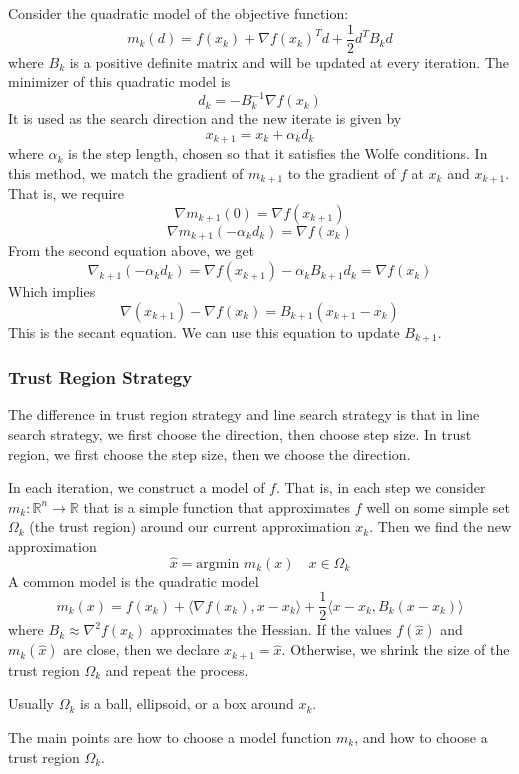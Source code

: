 Consider the quadratic model of the objective function:
$$m_k(d) = f(x_k) + \nabla f(x_k)^T d + \frac{1}{2} d^T B_k d$$
where $B_k$ is a positive definite matrix and will be updated at every iteration. The minimizer of this quadratic model is $$d_k = -B_k^{-1} \nabla f(x_k)$$
It is used as the search direction and the new iterate is given by $$x_{k+1} = x_k + \alpha_k d_k$$
where $\alpha_k$ is the step length, chosen so that it satisfies the Wolfe conditions. In this method, we match the gradient of $m_{k+1}$ to the gradient of $f$ at $x_k$ and $x_{k+1}$. That is, we require
$$\nabla m_{k+1}(0) = \nabla f(x_{k+1})$$
$$\nabla m_{k+1}(-\alpha_k d_k) = \nabla f(x_k)$$
From the second equation above, we get
$$\nabla_{k+1}(-\alpha_k d_k) = \nabla f(x_{k+1}) - \alpha_k B_{k+1} d_k = \nabla f(x_k)$$
Which implies
$$\nabla(x_{k+1}) - \nabla f(x_k) = B_{k+1}(x_{k+1} - x_k)$$
This is the secant equation. We can use this equation to update $B_{k+1}$.



\subsubsection{Trust Region Strategy}
The difference in trust region strategy and line search strategy is that in line search strategy, we first choose the direction, then choose step size. In trust region, we first choose the step size, then we choose the direction.
\begin{definition}
  In each iteration, we construct a model of $f$. That is, in each step we consider $m_k: \mathbb R^n \to \mathbb R$ that is a simple function that approximates $f$ well on some simple set $\Omega_k$ (the trust region) around our current approximation $x_k$. Then we find the new approximation $$\hat x = \text{argmin } m_k(x) \quad \text{$x \in \Omega_k$}$$
  A common model is the quadratic model $$m_k(x) = f(x_k) + \langle \nabla f(x_k), x - x_k \rangle + \frac{1}{2} \langle x - x_k, B_k(x - x_k) \rangle$$ where $B_k \approx \nabla^2 f(x_k)$ approximates the Hessian. If the values $f(\hat x)$ and $m_k(\hat x)$ are close, then we declare $x_{k+1} = \hat x$. Otherwise, we shrink the size of the trust region $\Omega_k$ and repeat the process.

  Usually $\Omega_k$ is a ball, ellipsoid, or a box around $x_k$.

  The main points are how to choose a model function $m_k$, and how to choose a trust region $\Omega_k$.
\end{definition}



